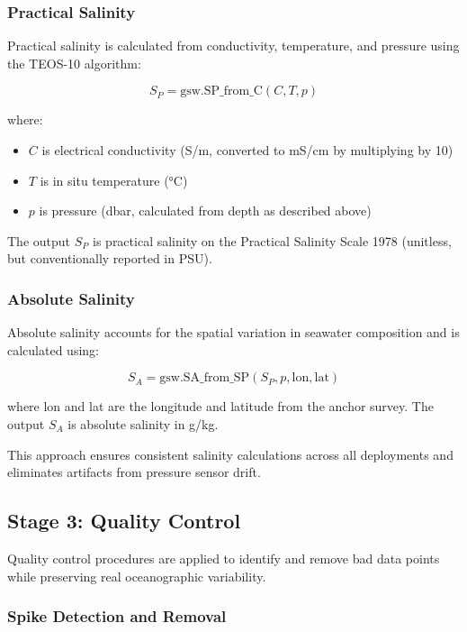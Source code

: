 \subsubsection{Practical Salinity}

Practical salinity is calculated from conductivity, temperature, and pressure using the TEOS-10 algorithm:

\begin{equation}
S_P = \text{gsw.SP\_from\_C}(C, T, p)
\end{equation}

where:
\begin{itemize}
    \item $C$ is electrical conductivity (S/m, converted to mS/cm by multiplying by 10)
    \item $T$ is in situ temperature (°C)
    \item $p$ is pressure (dbar, calculated from depth as described above)
\end{itemize}

The output $S_P$ is practical salinity on the Practical Salinity Scale 1978 (unitless, but conventionally reported in PSU).

\subsubsection{Absolute Salinity}

Absolute salinity accounts for the spatial variation in seawater composition and is calculated using:

\begin{equation}
S_A = \text{gsw.SA\_from\_SP}(S_P, p, \text{lon}, \text{lat})
\end{equation}

where lon and lat are the longitude and latitude from the anchor survey. The output $S_A$ is absolute salinity in g/kg.

This approach ensures consistent salinity calculations across all deployments and eliminates artifacts from pressure sensor drift.

\subsection{Stage 3: Quality Control}

Quality control procedures are applied to identify and remove bad data points while preserving real oceanographic variability.

\subsubsection{Spike Detection and Removal}


